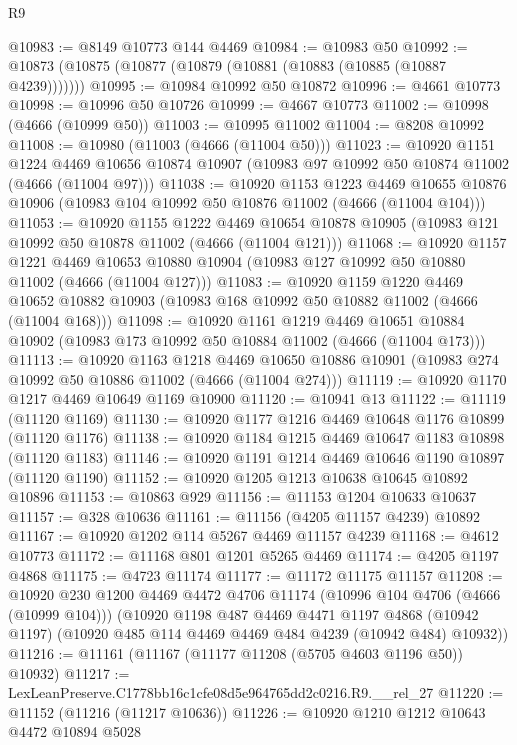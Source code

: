 \begin{lexlean}{R9}
\begin{coremodule}
@10983 := @8149 @10773 @144 @4469
@10984 := @10983 @50
@10992 := @10873 (@10875 (@10877 (@10879 (@10881 (@10883 (@10885 (@10887 @4239)))))))
@10995 := @10984 @10992 @50 @10872
@10996 := @4661 @10773
@10998 := @10996 @50 @10726
@10999 := @4667 @10773
@11002 := @10998 (@4666 (@10999 @50))
@11003 := @10995 @11002
@11004 := @8208 @10992
@11008 := @10980 (@11003 (@4666 (@11004 @50)))
@11023 := @10920
    @1151
    @1224
    @4469
    @10656
    @10874
    @10907
    (@10983 @97 @10992 @50 @10874 @11002 (@4666 (@11004 @97)))
@11038 := @10920
    @1153
    @1223
    @4469
    @10655
    @10876
    @10906
    (@10983 @104 @10992 @50 @10876 @11002 (@4666 (@11004 @104)))
@11053 := @10920
    @1155
    @1222
    @4469
    @10654
    @10878
    @10905
    (@10983 @121 @10992 @50 @10878 @11002 (@4666 (@11004 @121)))
@11068 := @10920
    @1157
    @1221
    @4469
    @10653
    @10880
    @10904
    (@10983 @127 @10992 @50 @10880 @11002 (@4666 (@11004 @127)))
@11083 := @10920
    @1159
    @1220
    @4469
    @10652
    @10882
    @10903
    (@10983 @168 @10992 @50 @10882 @11002 (@4666 (@11004 @168)))
@11098 := @10920
    @1161
    @1219
    @4469
    @10651
    @10884
    @10902
    (@10983 @173 @10992 @50 @10884 @11002 (@4666 (@11004 @173)))
@11113 := @10920
    @1163
    @1218
    @4469
    @10650
    @10886
    @10901
    (@10983 @274 @10992 @50 @10886 @11002 (@4666 (@11004 @274)))
@11119 := @10920 @1170 @1217 @4469 @10649 @1169 @10900
@11120 := @10941 @13
@11122 := @11119 (@11120 @1169)
@11130 := @10920 @1177 @1216 @4469 @10648 @1176 @10899 (@11120 @1176)
@11138 := @10920 @1184 @1215 @4469 @10647 @1183 @10898 (@11120 @1183)
@11146 := @10920 @1191 @1214 @4469 @10646 @1190 @10897 (@11120 @1190)
@11152 := @10920 @1205 @1213 @10638 @10645 @10892 @10896
@11153 := @10863 @929
@11156 := @11153 @1204 @10633 @10637
@11157 := @328 @10636
@11161 := @11156 (@4205 @11157 @4239) @10892
@11167 := @10920 @1202 @114 @5267 @4469 @11157 @4239
@11168 := @4612 @10773
@11172 := @11168 @801 @1201 @5265 @4469
@11174 := @4205 @1197 @4868
@11175 := @4723 @11174
@11177 := @11172 @11175 @11157
@11208 := @10920
    @230
    @1200
    @4469
    @4472
    @4706
    @11174
    (@10996 @104 @4706 (@4666 (@10999 @104)))
    (@10920
      @1198
      @487
      @4469
      @4471
      @1197
      @4868
      (@10942 @1197)
      (@10920 @485 @114 @4469 @4469 @484 @4239 (@10942 @484) @10932))
@11216 := @11161 (@11167 (@11177 @11208 (@5705 @4603 @1196 @50)) @10932)
@11217 := LexLeanPreserve.C1778bb16c1cfe08d5e964765dd2c0216.R9.__rel_27
@11220 := @11152 (@11216 (@11217 @10636))
@11226 := @10920 @1210 @1212 @10643 @4472 @10894 @5028

\end{coremodule}
\end{lexlean}
